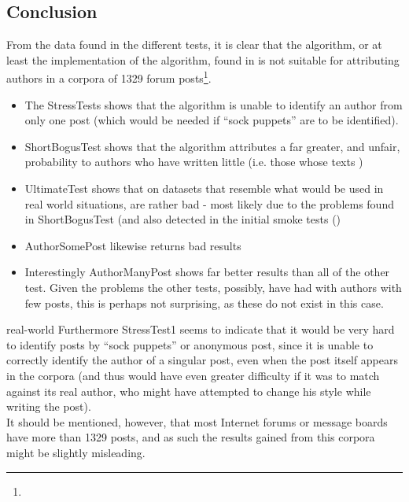 \subsection{Conclusion}
From the data found in the different tests, it is clear that the algorithm, or at least the implementation of the algorithm, found in \cite{nr4} is not suitable for attributing authors in a corpora of 1329 forum posts\footnote{}. 
\begin{itemize}
\item The StressTests shows that the algorithm is unable to identify an author from only one post (which would be needed if ``sock puppets'' are to be identified). 
\item ShortBogusTest shows that the algorithm attributes a far greater, and unfair, probability to authors who have written little (i.e. those whose texts )
\item UltimateTest shows that on datasets that resemble what would be used in real world situations, are rather bad - most likely due to the problems found in ShortBogusTest (and also detected in the initial smoke tests ()
\item AuthorSomePost likewise returns bad results 
\item Interestingly AuthorManyPost shows far better results than all of the other test. Given the problems the other tests, possibly, have had with authors with few posts, this is perhaps not surprising, as these do not exist in this case.
\end{itemize}real-world 
Furthermore StressTest1 seems to indicate that it would be very hard to identify posts by ``sock puppets'' or anonymous post, since it is unable to correctly identify the author of a singular post, even when the post itself appears in the corpora (and thus would have even greater difficulty if it was to match against its real author, who might have attempted to change his style while writing the post).\\ 

It should be mentioned, however, that most Internet forums or message boards have more than 1329 posts, and as such the results gained from this corpora might be slightly misleading.
